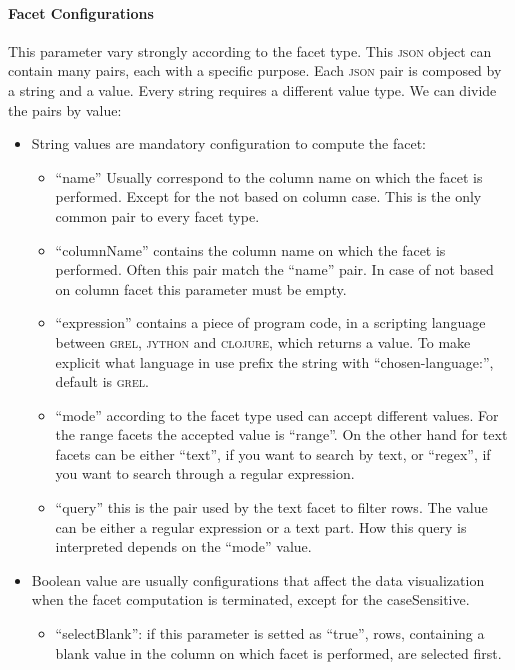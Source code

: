 \paragraph{Facet Configurations} This parameter vary strongly according to the facet type.
This \textsc{json} object can contain many pairs, each with a specific purpose. Each \textsc{json} pair is composed by a string and a value. Every string requires a different value type. We can divide the pairs by value:
\begin{itemize}
	\item String values are mandatory configuration to compute the facet:
	\begin{itemize}
		\item \textsf{``name''} Usually correspond to the column name on which the facet is performed. Except for the not based on column case. This is the only common pair to every facet type. 
		\item \textsf{``columnName''} contains the column name on which the facet is performed. Often this pair match the ``name'' pair. In case of not based on column facet this parameter must be empty.
		\item \textsf{``expression''} contains a piece of program code, in a scripting language between \textsc{grel}, \textsc{jython} and \textsc{clojure}, which returns a value. To make explicit what language in use prefix the string with ``chosen-language:'', default is \textsc{grel}.
		\item \textsf{``mode''} according to the facet type used can accept different values. For the range facets the accepted value is ``range''. On the other hand for text facets can be either ``text'', if you want to search by text, or ``regex'', if you want to search through a regular expression.
		\item \textsf{``query''} this is the pair used by the \textsf{text} facet to filter rows. The value can be either a regular expression or a text part. How this query is interpreted depends on the \textsf{``mode''} value.
	\end{itemize}
	\item Boolean value are usually configurations that affect the data visualization when the facet computation is terminated, except for the \textsf{caseSensitive}.
	\begin{itemize}		
		\item \textsf{``selectBlank''}: if this parameter is setted as ``true'', rows, containing a blank value in the column on which facet is performed, are selected first.

\end{itemize}
\end{itemize}

